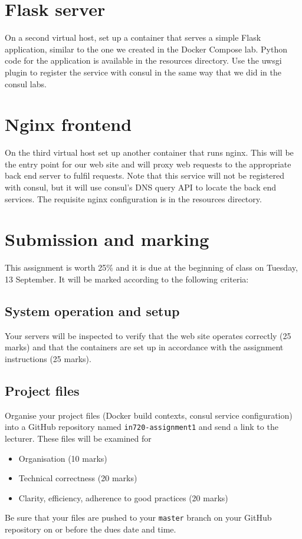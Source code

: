 \documentclass{article}
\begin{document}
\section{Flask  server}
On a second virtual host, set up a container that serves a simple Flask application, similar to the one we created in the Docker Compose lab.  Python code for the application is available in the resources directory. Use the uwsgi plugin to register the service with consul in the same way that we did in the consul labs.

\section{Nginx frontend}
On the third virtual host set up another container that runs nginx.  This will be the entry point for our web site and will proxy web requests to the appropriate back end server to fulfil requests. Note that this service will not be registered with consul, but it will use consul's DNS query API to locate the back end services. The requisite nginx configuration is in the resources directory.

\section{Submission and marking} 

This assignment is worth 25\% and it is due at the beginning of class on Tuesday, 13 September. It will be marked according to the following criteria:

\subsection{System operation and setup}
Your servers will be inspected to verify that the web site operates correctly (25 marks) and that the containers are set up in accordance with the assignment instructions (25 marks).

\subsection{Project files}
Organise your project files (Docker build contexts, consul service configuration) into a GitHub repository named \texttt{in720-assignment1} and send a link to the lecturer. These files will be examined for

\begin{itemize}
  \item Organisation (10 marks)
  \item Technical correctness (20 marks)
  \item Clarity, efficiency, adherence to good practices (20 marks)
  \end{itemize}
  
  Be sure that your files are pushed to your \texttt{master} branch on your GitHub repository on or before the dues date and time. 
 
\end{document}
